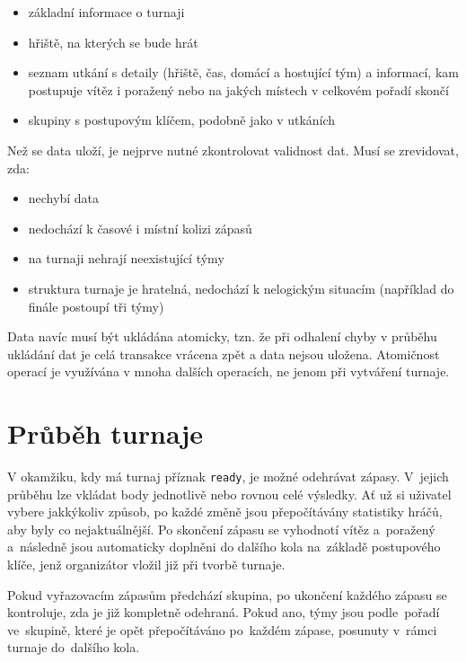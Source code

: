 \begin{itemize}
 \item základní informace o turnaji
 \item hřiště, na kterých se bude hrát
 \item seznam utkání s detaily (hřiště, čas, domácí a hostující tým) a informací, kam postupuje vítěz i poražený nebo na jakých místech v celkovém pořadí skončí
 \item skupiny s postupovým klíčem, podobně jako v utkáních
\end{itemize}

Než se data uloží, je nejprve nutné zkontrolovat validnost dat. Musí se zrevidovat, zda: 

\begin{itemize}
 \item nechybí data
 \item nedochází k časové i místní kolizi zápasů
 \item na turnaji nehrají neexistující týmy
 \item struktura turnaje je hratelná, nedochází k nelogickým situacím (například do finále postoupí tři týmy)
\end{itemize}

Data navíc musí být ukládána atomicky, tzn. že při odhalení chyby v průběhu ukládání dat je celá transakce
vrácena zpět a data nejsou uložena. Atomičnost operací je využívána v mnoha dalších operacích,
ne jenom při vytváření turnaje.

\section{Průběh turnaje}

V okamžiku, kdy má turnaj příznak \texttt{ready}, je možné odehrávat zápasy.
V~jejich průběhu lze vkládat body jednotlivě nebo rovnou celé výsledky.
Ať už si uživatel vybere jakkýkoliv způsob, po každé změně jsou přepočítávány
statistiky hráčů, aby byly co nejaktuálnější. Po skončení zápasu se vyhodnotí vítěz
a~poražený a~následně jsou automaticky doplněni do dalšího kola na~základě postupového klíče,
jenž organizátor vložil již při tvorbě turnaje.

Pokud vyřazovacím zápasům předchází skupina, po ukončení každého zápasu se kontroluje,
zda je již kompletně odehraná. Pokud ano, týmy jsou podle~pořadí ve~skupině, které je
opět přepočítáváno po~každém zápase, posunuty v~rámci turnaje do~dalšího kola.


